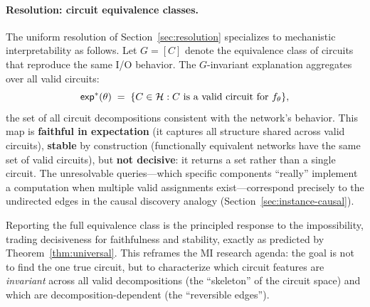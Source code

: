 \paragraph{Resolution: circuit equivalence classes.}
The uniform resolution of Section~\ref{sec:resolution} specializes to
mechanistic interpretability as follows.  Let $G = [C]$ denote the
equivalence class of circuits that reproduce the same I/O behavior.
The $G$-invariant explanation aggregates over all valid circuits:
\[
  \mathsf{exp}^*(\theta)
  \;=\;
  \{C \in \mathcal{H} : C \text{ is a valid circuit for } f_\theta\},
\]
the set of all circuit decompositions consistent with the network's
behavior.  This map is \textbf{faithful in expectation} (it captures
all structure shared across valid circuits), \textbf{stable} by
construction (functionally equivalent networks have the same set of
valid circuits), but \textbf{not decisive}: it returns a set rather
than a single circuit.  The unresolvable queries---which specific
components ``really'' implement a computation when multiple valid
assignments exist---correspond precisely to the undirected edges in
the causal discovery analogy (Section~\ref{sec:instance-causal}).

Reporting the full equivalence class is the principled response to the
impossibility, trading decisiveness for faithfulness and stability, exactly
as predicted by Theorem~\ref{thm:universal}.  This reframes the MI
research agenda: the goal is not to find the one true circuit, but to
characterize which circuit features are \emph{invariant} across all valid
decompositions (the ``skeleton'' of the circuit space) and which are
decomposition-dependent (the ``reversible edges'').
